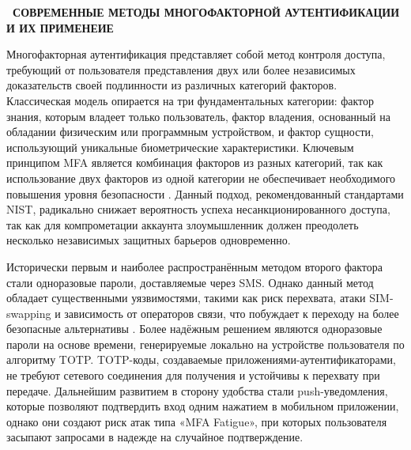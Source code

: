 \documentclass{SibFU-docs}
\begin{document}
\newpage
{}
\begin{center}\textbf{\thesection\ СОВРЕМЕННЫЕ МЕТОДЫ МНОГОФАКТОРНОЙ АУТЕНТИФИКАЦИИ И ИХ ПРИМЕНЕИЕ}\end{center}
\vspace*{-1.5em}

Многофакторная аутентификация представляет собой метод контроля доступа, требующий от пользователя представления двух или более независимых доказательств своей подлинности из различных категорий факторов. Классическая модель опирается на три фундаментальных категории: фактор знания, которым владеет только пользователь, фактор владения, основанный на обладании физическим или программным устройством, и фактор сущности, использующий уникальные биометрические характеристики. Ключевым принципом MFA является комбинация факторов из разных категорий, так как использование двух факторов из одной категории не обеспечивает необходимого повышения уровня безопасности \cite{yandex_cloud_2fa}. Данный подход, рекомендованный стандартами NIST, радикально снижает вероятность успеха несанкционированного доступа, так как для компрометации аккаунта злоумышленник должен преодолеть несколько независимых защитных барьеров одновременно.


Исторически первым и наиболее распространённым методом второго фактора стали одноразовые пароли, доставляемые через SMS. Однако данный метод обладает существенными уязвимостями, такими как риск перехвата, атаки SIM-swapping и зависимость от операторов связи, что побуждает к переходу на более безопасные альтернативы \cite{anti_malware_mfa_2025}. Более надёжным решением являются одноразовые пароли на основе времени, генерируемые локально на устройстве пользователя по алгоритму TOTP. TOTP-коды, создаваемые приложениями-аутентификаторами, не требуют сетевого соединения для получения и устойчивы к перехвату при передаче. Дальнейшим развитием в сторону удобства стали push-уведомления, которые позволяют подтвердить вход одним нажатием в мобильном приложении, однако они создают риск атак типа «MFA Fatigue», при которых пользователя засыпают запросами в надежде на случайное подтверждение.

\end{document}
